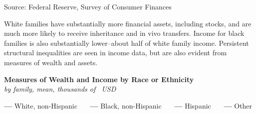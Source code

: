 \documentclass{report}
\begin{document}
{\begin{minipage}{1.0\textwidth}
\footnotesize{Source: Federal Reserve, Survey of Consumer Finances}
\vspace{1.5mm}

\small White families have substantially more financial assets, including stocks, and are much more likely to receive inheritance and in vivo transfers. Income for black families is also substantially lower--about half of white family income. Persistent structural inequalities are seen in income data, but are also evident from measures of wealth and assets.
\vspace{0.5mm}

\normalsize \textbf{Measures of Wealth and Income by Race or Ethnicity}\\
\footnotesize{\textit{by family, mean, thousands of \unskip \ USD}}
\vspace{-0.5mm}

\Large{\color{red!80!white}\textbf{---}} \footnotesize{White, non-Hispanic} \ \ \ \Large{\color{blue!80!black}\textbf{---}} \footnotesize{Black, non-Hispanic} \ \ \ \Large{\color{magenta!60!violet}\textbf{---}} \footnotesize{Hispanic} \ \ \ \Large{\color{black!40!white}\textbf{---}} \footnotesize{Other}
\end{minipage}
\vspace{-0.5mm}

}
\end{document}
